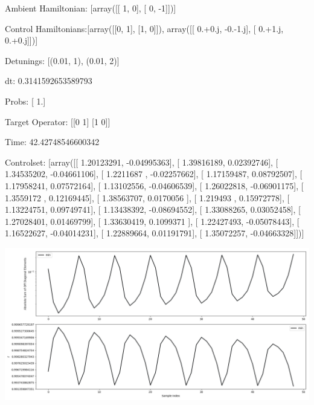 \documentclass{article}
\begin{document}
    

\newpage

Ambient Hamiltonian: [array([[ 1,  0],
       [ 0, -1]])]

Control Hamiltonians:[array([[0, 1],
       [1, 0]]), array([[ 0.+0.j, -0.-1.j],
       [ 0.+1.j,  0.+0.j]])]

Detunings: [(0.01, 1), (0.01, 2)]

 dt: 0.3141592653589793

Probs: [ 1.]

Target Operator: [[0 1]
 [1 0]]

Time: 42.42748546600342

Controlset: [array([[ 1.20123291, -0.04995363],
       [ 1.39816189,  0.02392746],
       [ 1.34535202, -0.04661106],
       [ 1.2211687 , -0.02257662],
       [ 1.17159487,  0.08792507],
       [ 1.17958241,  0.07572164],
       [ 1.13102556, -0.04606539],
       [ 1.26022818, -0.06901175],
       [ 1.3559172 ,  0.12169445],
       [ 1.38563707,  0.0170056 ],
       [ 1.219493  ,  0.15972778],
       [ 1.13224751,  0.09749741],
       [ 1.13438392, -0.08694552],
       [ 1.33088265,  0.03052458],
       [ 1.27028401,  0.01469799],
       [ 1.33630419,  0.1099371 ],
       [ 1.22427493, -0.05078443],
       [ 1.16522627, -0.04014231],
       [ 1.22889664,  0.01191791],
       [ 1.35072257, -0.04663328]])]
\begin{center}
\includegraphics[scale=.9]{report_pickled_controls66/control_dpn_all.png}

\end{center}
\end{document}
